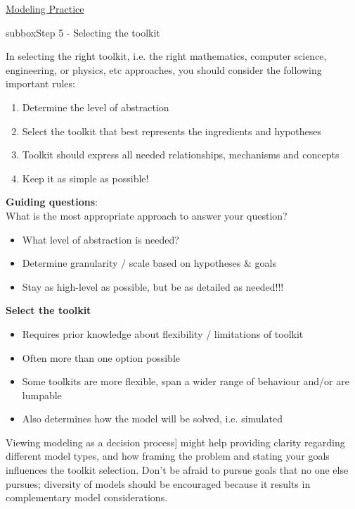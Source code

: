 \begin{textbox}{\href{https://compneuro.neuromatch.io/projects/modelingsteps/ModelingSteps_5through10.html}{Modeling Practice  } }

\begin{subbox}{subbox}{Step 5 - Selecting the toolkit}
\scriptsize

In selecting the right toolkit, i.e. the right mathematics, computer science, engineering, or physics, etc approaches, you should consider the following important rules:
\begin{enumerate}
    \item 
 Determine the level of abstraction
 \item  Select the toolkit that best represents the ingredients and hypotheses
 \item  Toolkit should express all needed relationships, mechanisms and concepts
 \item  Keep it as simple as possible!
\end{enumerate}

\textbf{Guiding questions}:\\
What is the most appropriate approach to answer your question?
\begin{itemize}

  \item  What level of abstraction is needed?
  \item  Determine granularity / scale based on hypotheses \& goals
  \item  Stay as high-level as possible, but be as detailed as needed!!!
  \end{itemize}

\textbf{Select the toolkit}
 \begin{itemize}
    \item  Requires prior knowledge about flexibility / limitations of toolkit
  \item  Often more than one option possible
  \item  Some toolkits are more flexible, span a wider range of behaviour and/or are lumpable
 \item  Also determines how the model will be solved, i.e. simulated
 
 \end{itemize}

Viewing modeling as a decision process] might help providing clarity regarding different model types, and how framing the problem and stating your goals influences the toolkit selection. Don't be afraid to pursue goals that no one else pursues; diversity of models should be encouraged because it results in complementary model considerations. 


\end{subbox}
\end{textbox}
